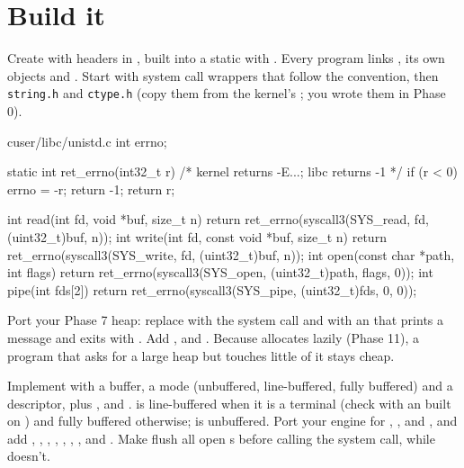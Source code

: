 \documentclass[11pt,a4paper]{article}
\begin{document}
\section{Build it}

Create  with headers in , built into a static  with
. Every program links , its own objects and . Start with system call
wrappers that follow the  convention, then \texttt{string.h} and \texttt{ctype.h} (copy them from the
kernel's ; you wrote them in Phase 0).

\begin{lst}{c}{user/libc/unistd.c}
int errno;

static int ret_errno(int32_t r)             /* kernel returns -E...; libc returns -1 */
{
    if (r < 0) {
        errno = -r;
        return -1;
    }
    return r;
}

int read(int fd, void *buf, size_t n)  { return ret_errno(syscall3(SYS_read,  fd, (uint32_t)buf, n)); }
int write(int fd, const void *buf, size_t n) { return ret_errno(syscall3(SYS_write, fd, (uint32_t)buf, n)); }
int open(const char *path, int flags)  { return ret_errno(syscall3(SYS_open, (uint32_t)path, flags, 0)); }
int pipe(int fds[2])                   { return ret_errno(syscall3(SYS_pipe, (uint32_t)fds, 0, 0)); }
\end{lst}

Port your Phase 7 heap: replace  with the  system call and  with an
 that prints a message and exits with . Add ,  and .
Because  allocates lazily (Phase 11), a program that asks for a large heap but touches little of it stays
cheap.

Implement  with a buffer, a mode (unbuffered, line-buffered, fully buffered) and a descriptor, plus
,  and .  is line-buffered when it is a terminal (check with an
 built on ) and fully buffered otherwise;  is unbuffered. Port your 
engine for , ,  and , and add , ,
, , , , ,  and . Make
 flush all open s before calling the system call, while  doesn't.
\end{document}
